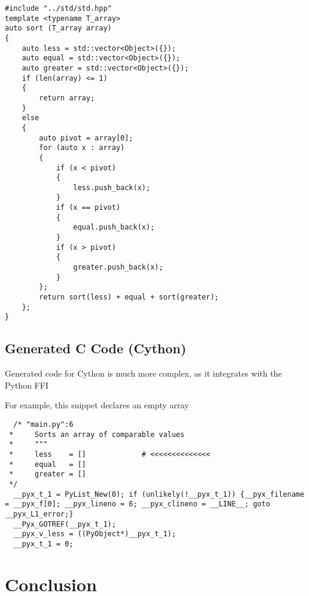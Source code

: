 \documentclass{article}
\begin{document}
\begin{lstlisting}
#include "../std/std.hpp"
template <typename T_array>
auto sort (T_array array)
{
    auto less = std::vector<Object>({});
    auto equal = std::vector<Object>({});
    auto greater = std::vector<Object>({});
    if (len(array) <= 1)
    {
        return array;
    }
    else
    {
        auto pivot = array[0];
        for (auto x : array)
        {
            if (x < pivot)
            {
                less.push_back(x);
            }
            if (x == pivot)
            {
                equal.push_back(x);
            }
            if (x > pivot)
            {
                greater.push_back(x);
            }
        };
        return sort(less) + equal + sort(greater);
    };
}
\end{lstlisting}

\newpage
\subsection{Generated C Code (Cython)}

Generated code for Cython is much more complex, as it integrates with the Python FFI

For example, this snippet declares an empty array

\begin{lstlisting}
  /* "main.py":6
 *     Sorts an array of comparable values
 *     """
 *     less    = []             # <<<<<<<<<<<<<<
 *     equal   = []
 *     greater = []
 */
  __pyx_t_1 = PyList_New(0); if (unlikely(!__pyx_t_1)) {__pyx_filename = __pyx_f[0]; __pyx_lineno = 6; __pyx_clineno = __LINE__; goto __pyx_L1_error;}
  __Pyx_GOTREF(__pyx_t_1);
  __pyx_v_less = ((PyObject*)__pyx_t_1);
  __pyx_t_1 = 0;
\end{lstlisting}

\newpage

\section{Conclusion}
\end{document}
